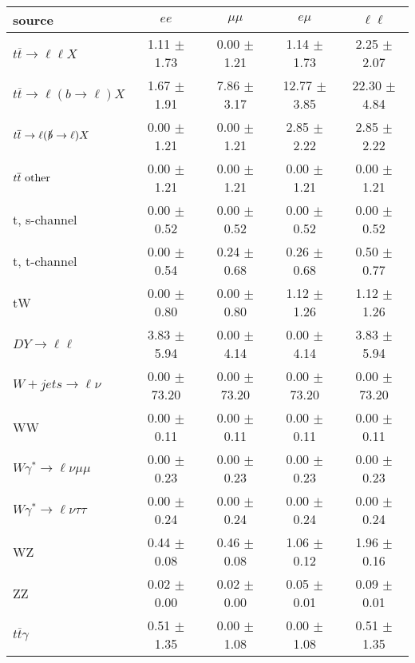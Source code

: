 \begin{tabular}{l|cccc} \hline\hline
source & $ee$ & $\mu\mu$ & $e\mu$ & $\ell\ell $ \\
\hline
$t\overline{t} \rightarrow \ell \ell X$ &  1.11 $\pm$  1.73 &  0.00 $\pm$  1.21 &  1.14 $\pm$  1.73 &  2.25 $\pm$  2.07 \\
$t\overline{t} \rightarrow \ell (b \rightarrow \ell) X$ &  1.67 $\pm$  1.91 &  7.86 $\pm$  3.17 & 12.77 $\pm$  3.85 & 22.30 $\pm$  4.84 \\
$t\overline{t} \rightarrow \ell (\slashed b \rightarrow \ell) X$ &  0.00 $\pm$  1.21 &  0.00 $\pm$  1.21 &  2.85 $\pm$  2.22 &  2.85 $\pm$  2.22 \\
        $t\overline{t}\ \rm{other}$ &  0.00 $\pm$  1.21 &  0.00 $\pm$  1.21 &  0.00 $\pm$  1.21 &  0.00 $\pm$  1.21 \\
\hline
                       t, s-channel &  0.00 $\pm$  0.52 &  0.00 $\pm$  0.52 &  0.00 $\pm$  0.52 &  0.00 $\pm$  0.52 \\
                       t, t-channel &  0.00 $\pm$  0.54 &  0.24 $\pm$  0.68 &  0.26 $\pm$  0.68 &  0.50 $\pm$  0.77 \\
                                 tW &  0.00 $\pm$  0.80 &  0.00 $\pm$  0.80 &  1.12 $\pm$  1.26 &  1.12 $\pm$  1.26 \\
\hline
         $DY \rightarrow \ell \ell$ &  3.83 $\pm$  5.94 &  0.00 $\pm$  4.14 &  0.00 $\pm$  4.14 &  3.83 $\pm$  5.94 \\
      $W+jets \rightarrow \ell \nu$ &  0.00 $\pm$ 73.20 &  0.00 $\pm$ 73.20 &  0.00 $\pm$ 73.20 &  0.00 $\pm$ 73.20 \\
                                 WW &  0.00 $\pm$  0.11 &  0.00 $\pm$  0.11 &  0.00 $\pm$  0.11 &  0.00 $\pm$  0.11 \\
\hline
$W\gamma^{*} \rightarrow \ell \nu \mu\mu$ &  0.00 $\pm$  0.23 &  0.00 $\pm$  0.23 &  0.00 $\pm$  0.23 &  0.00 $\pm$  0.23 \\
$W\gamma^{*} \rightarrow \ell \nu \tau\tau$ &  0.00 $\pm$  0.24 &  0.00 $\pm$  0.24 &  0.00 $\pm$  0.24 &  0.00 $\pm$  0.24 \\
                                 WZ &  0.44 $\pm$  0.08 &  0.46 $\pm$  0.08 &  1.06 $\pm$  0.12 &  1.96 $\pm$  0.16 \\
                                 ZZ &  0.02 $\pm$  0.00 &  0.02 $\pm$  0.00 &  0.05 $\pm$  0.01 &  0.09 $\pm$  0.01 \\
\hline
              $t\overline{t}\gamma$ &  0.51 $\pm$  1.35 &  0.00 $\pm$  1.08 &  0.00 $\pm$  1.08 &  0.51 $\pm$  1.35 \\

\end{tabular}
